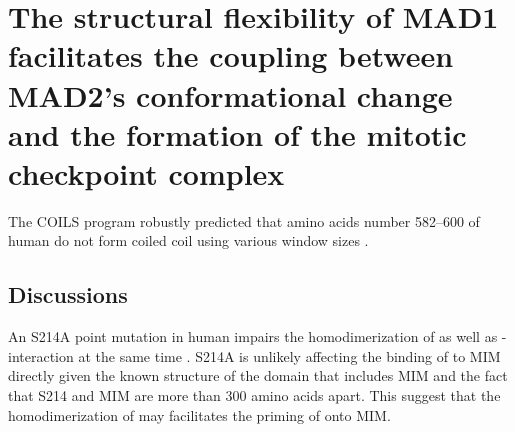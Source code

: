 \chapter{The structural flexibility of MAD1 facilitates the coupling between MAD2's conformational change and the formation of the mitotic checkpoint complex}
\label{chpt:4}
The COILS program robustly predicted that amino acids number 582--600 of human  do not form coiled coil using various window sizes \cite{LupasCOILS}.

\section*{Discussions}

An S214A point mutation in human  impairs the homodimerization of  as well as - interaction at the same time \cite{ATMPhosphorylatesMad1S214}. S214A is unlikely affecting the binding of  to  MIM directly given the known structure of the domain that includes MIM \cite{Structure1GO4} and the fact that S214 and MIM are more than 300 amino acids apart. This suggest that the homodimerization of  may facilitates the priming of  onto  MIM.
